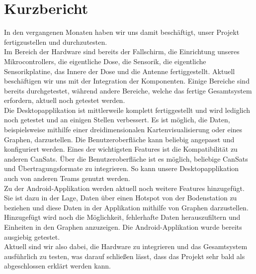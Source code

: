 \section{Kurzbericht}
In den vergangenen Monaten haben wir uns damit beschäftigt, unser Projekt fertigzustellen und durchzutesten. \\
Im Bereich der Hardware sind bereits der Fallschirm, die Einrichtung unseres Mikrocontrollers, die eigentliche Dose, die Sensorik, die eigentliche Sensorikplatine, das Innere der Dose und die Antenne fertiggestellt. Aktuell beschäftigen wir uns mit der Integration der Komponenten. Einige Bereiche sind bereits durchgetestet, während andere Bereiche, welche das fertige Gesamtsystem erfordern, aktuell noch getestet werden. \\
Die Desktopapplikation ist mittlerweile komplett fertiggestellt und wird lediglich noch getestet und an einigen Stellen verbessert. Es ist möglich, die Daten, beispielsweise mithilfe einer dreidimensionalen Kartenvisualisierung oder eines Graphen, darzustellen. Die Benutzeroberfläche kann beliebig angepasst und konfiguriert werden. Eines der wichtigsten Features ist die Kompatibilität zu anderen CanSats. Über die Benutzeroberfläche ist es möglich, beliebige CanSats und Übertragungsformate zu integrieren. So kann unsere Desktopapplikation auch von anderen Teams genutzt werden. \\
Zu der Android-Applikation werden aktuell noch weitere Features hinzugefügt. Sie ist dazu in der Lage, Daten über einen Hotspot von der Bodenstation zu beziehen und diese Daten in der Applikation mithilfe von Graphen darzustellen. Hinzugefügt wird noch die Möglichkeit, fehlerhafte Daten herauszufiltern und Einheiten in den Graphen anzuzeigen. Die Android-Applikation wurde bereits ausgiebig getestet. \\
Aktuell sind wir also dabei, die Hardware zu integrieren und das Gesamtsystem ausführlich zu testen, was darauf schließen lässt, dass das Projekt sehr bald als abgeschlossen erklärt werden kann.